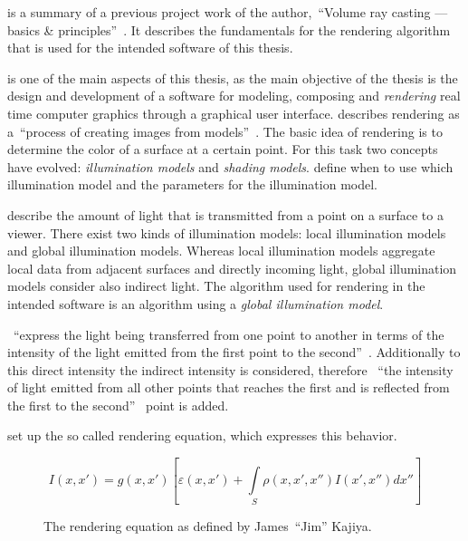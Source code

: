 \documentclass[%
    a4paper,    %
    justified,  %
    nobib,      %
    openany     %
]{tufte-book}
\begin{document}
 is a summary of a previous project
work of the author,~\enquote{Volume ray casting --- basics \&
principles}~\cite{osterwalder-volume-2016}. It describes the fundamentals for
the rendering algorithm that is used for the intended software of this thesis.

 is one of the main aspects of this thesis, as the main
objective of the thesis is the design and development of a software for
modeling, composing and \textit{rendering} real time computer graphics through a
graphical user interface. \citeauthor{foley_computer_1996} describes rendering
as a~\enquote{process of creating images from
models}~\cite{foley_computer_1996}. The basic idea of rendering is to determine
the color of a surface at a certain point. For this task two concepts have
evolved: \textit{illumination models} and \textit{shading models}.
 define when to use which illumination model and the
parameters for the illumination model.

 describe the amount of light that is
transmitted from a point on a surface to a viewer. There exist two kinds of
illumination models: local illumination models and global illumination models.
Whereas local illumination models aggregate local data from adjacent surfaces
and directly incoming light, global illumination models consider also indirect
light. The algorithm used for rendering in the intended software is an
algorithm using a \textit{global illumination model}.

~\enquote{express the light being
transferred from one point to another in terms of the intensity of the light
emitted from the first point to the second}~\cite[pp. 775 and
776]{foley_computer_1996}. Additionally to this direct intensity the indirect
intensity is considered, therefore ~\enquote{the intensity of light emitted from
all other points that reaches the first and is reflected from the first to the
second}~\cite[pp. 775 and 776]{foley_computer_1996} point is added.

\newpage{}

 set up the so called rendering
equation, which expresses this behavior.~\parencites{kajiya_rendering_1986}[p.
776]{foley_computer_1996}

\begin{figure}
  \label{eq:rendering-equation}
  \caption{The rendering equation as defined by James~\enquote{Jim} Kajiya.}
  \begin{equation}
    I(x, x') = g(x, x')[\varepsilon(x, x') + \int\limits_{S}\rho(x, x', x'')I(x', x'')dx'']
  \end{equation}
\end{figure}
\end{document}
